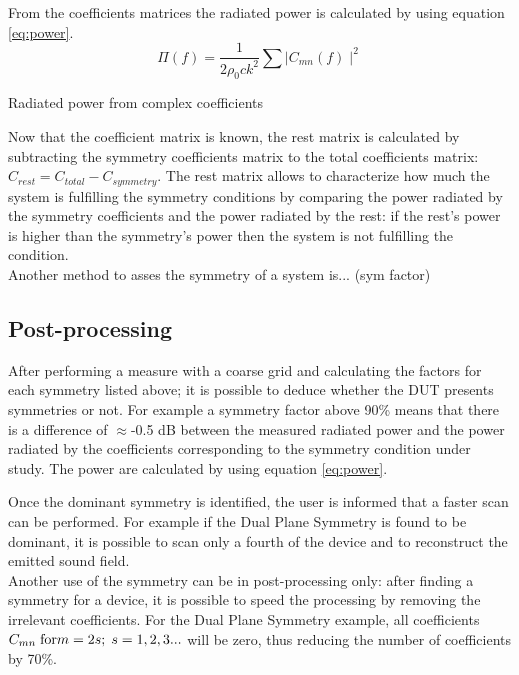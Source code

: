 \documentclass{report}
\newcommand{\myequations}[1]{%
  \refstepcounter{myequations}%
  \addcontentsline{equ}{myequations}
    {\protect\numberline{\theequation}#1}\par%
}
\begin{document}
From the coefficients matrices the radiated power is calculated by using equation \ref{eq:power}.
\begin{equation}
	\Pi(f) = \frac{1}{2\rho _{0}c k^{2}} \sum \mid C_{mn}(f)\mid ^{2}
	\label{eq:power}
\end{equation}
\myequations{Radiated power from complex coefficients}

Now that the coefficient matrix is known, the rest matrix is calculated by subtracting the symmetry coefficients matrix to the total coefficients matrix: $C_{rest} = C_{total} - C_{symmetry}$. The rest matrix allows to characterize how much the system is fulfilling the symmetry conditions by comparing the power radiated by the symmetry coefficients and the power radiated by the rest: if the rest's power is higher than the symmetry's power then the system is not fulfilling the condition.\\

Another method to asses the symmetry of a system is... (sym factor)





\subsection{Post-processing}

After performing a measure with a coarse grid and calculating the factors for each symmetry listed above; it is possible to deduce whether the DUT presents symmetries or not. For example a symmetry factor above 90\% means that there is a difference of $\approx$-0.5 dB between the measured radiated power and the power radiated by the coefficients corresponding to the symmetry condition under study. The power are calculated by using equation \ref{eq:power}.



Once the dominant symmetry is identified, the user is informed that a faster scan can be performed. For example if the Dual Plane Symmetry is found to be dominant, it is possible to scan only a fourth of the device and to reconstruct the emitted sound field.\\

Another use of the symmetry can be in post-processing only: after finding a symmetry for a device, it is possible to speed the processing by removing the irrelevant coefficients. For the Dual Plane Symmetry example, all coefficients  $C_{mn} \;  \textup{for}   m = 2s; \; s =1, 2, 3...$ will be zero, thus reducing the number of coefficients by 70\%.\\
\end{document}

